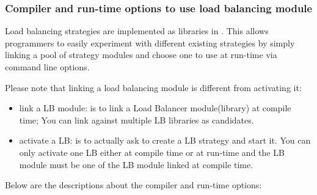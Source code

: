 \subsubsection{Compiler and run-time options to use load balancing module}
\label{lbOption}

Load balancing strategies are implemented as libraries in \charmpp{}. This
allows programmers to easily experiment with different existing strategies 
by simply linking a pool of strategy modules and choose 
one to use at run-time via command line options.

Please note that linking a load balancing module is different from activating it:
\begin{itemize}
\item link a LB module: is to link a Load Balancer module(library) at 
   compile time; You can link against multiple LB libraries as candidates.
\item activate a LB: is to actually ask to create a LB strategy and 
   start it. You can only activate one LB either at compile time or at
   run-time and the LB module must be one of the LB module linked at 
   compile time.
\end{itemize}


Below are the descriptions about the compiler and run-time options:

